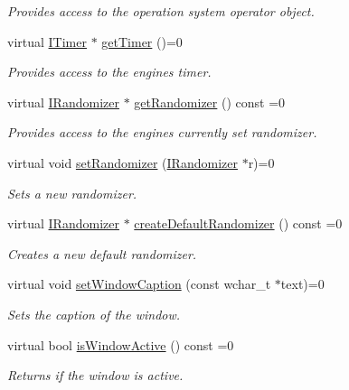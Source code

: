 \begin{DoxyCompactItemize}
\begin{DoxyCompactList}\small\item\em Provides access to the operation system operator object. \end{DoxyCompactList}\item 
virtual \hyperlink{classirr_1_1ITimer}{I\+Timer} $\ast$ \hyperlink{classirr_1_1IrrlichtDevice_a96c30fb7f644e1d1dabff563bde26460}{get\+Timer} ()=0
\begin{DoxyCompactList}\small\item\em Provides access to the engine\textquotesingle{}s timer. \end{DoxyCompactList}\item 
virtual \hyperlink{classirr_1_1IRandomizer}{I\+Randomizer} $\ast$ \hyperlink{classirr_1_1IrrlichtDevice_aaba0cb18cac48e381d841ad763c7ea8b}{get\+Randomizer} () const =0
\begin{DoxyCompactList}\small\item\em Provides access to the engine\textquotesingle{}s currently set randomizer. \end{DoxyCompactList}\item 
virtual void \hyperlink{classirr_1_1IrrlichtDevice_af996a8a8031dacd823e3c65ee3ed2c33}{set\+Randomizer} (\hyperlink{classirr_1_1IRandomizer}{I\+Randomizer} $\ast$r)=0
\begin{DoxyCompactList}\small\item\em Sets a new randomizer. \end{DoxyCompactList}\item 
virtual \hyperlink{classirr_1_1IRandomizer}{I\+Randomizer} $\ast$ \hyperlink{classirr_1_1IrrlichtDevice_a267b069ea2c5f5b008fd7afa5b931ee9}{create\+Default\+Randomizer} () const =0
\begin{DoxyCompactList}\small\item\em Creates a new default randomizer. \end{DoxyCompactList}\item 
virtual void \hyperlink{classirr_1_1IrrlichtDevice_a3d7c98d520bf18ce1973c6f1439a7c0f}{set\+Window\+Caption} (const wchar\+\_\+t $\ast$text)=0
\begin{DoxyCompactList}\small\item\em Sets the caption of the window. \end{DoxyCompactList}\item 
virtual bool \hyperlink{classirr_1_1IrrlichtDevice_abd3c88336b739da2694883d5ffd25a70}{is\+Window\+Active} () const =0
\begin{DoxyCompactList}\small\item\em Returns if the window is active. \end{DoxyCompactList}\item 

\end{DoxyCompactItemize}
